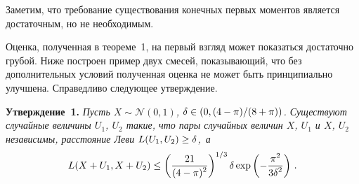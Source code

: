 \begin{multicols}{2}
Заметим, что требование существования конечных первых моментов
является достаточным, но не необходимым.

Оценка, полученная в теореме~1, на первый взгляд
может показаться достаточно грубой.  Ниже построен пример двух
смесей, показывающий, что без дополнительных условий полученная
оценка не может быть принципиально улучшена. Справедливо следующее
утверждение.

\medskip

\noindent
\textbf{Утверждение~1.}
\textit{Пусть $X\sim\mathcal{N}(0,1)$, $\delta \hm\in (0,({4 - \pi})/({8 + \pi}))$.
Существуют случайные величины $U_1$, $U_2$ такие, что пары случайных
величин $X$, $U_1$ и $X$, $U_2$ независимы, расстояние Леви $L(U_1,
U_2)\hm\ge\delta$,~а}
$$
L(X+U_1, X+U_2)\le
\left(\displaystyle\frac{\displaystyle 21 \mathstrut}{\displaystyle (4-\pi)^2\mathstrut}\right)^{1/3}
\delta \exp\left(- {\displaystyle\frac{\displaystyle \pi^2\mathstrut}{\displaystyle 3\delta^2\mathstrut}}\right)
\,.
$$


\end{multicols}
